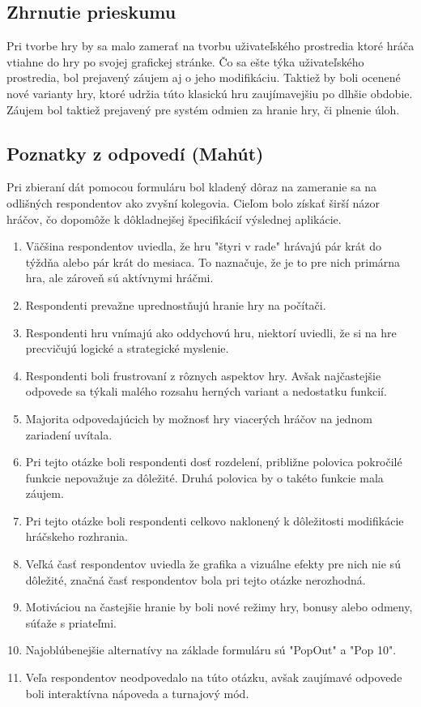 \documentclass[a4paper, 11pt, onecolumn]{article}
\begin{document}
\subsection*{Zhrnutie prieskumu}
Pri tvorbe hry by sa malo zamerať na tvorbu uživateľského prostredia ktoré hráča vtiahne do hry po svojej grafickej stránke.
Čo sa ešte týka uživateľského prostredia, bol prejavený záujem aj o jeho modifikáciu.
Taktiež by boli ocenené nové varianty hry, ktoré udržia túto klasickú hru zaujímavejšiu po dlhšie obdobie. Záujem bol taktiež
prejavený pre systém odmien za hranie hry, či plnenie úloh.
\subsection{Poznatky z odpovedí (Mahút)}
Pri zbieraní dát pomocou formuláru bol kladený dôraz na zameranie sa na odlišných respondentov ako zvyšní kolegovia.
Cieľom bolo získať širší názor hráčov, čo dopomôže k dôkladnejšej špecifikácií výslednej aplikácie.
\begin{enumerate}
  \item Väčšina respondentov uviedla, že hru "štyri v rade" hrávajú pár krát do týždňa alebo pár krát do mesiaca. To naznačuje, že je to pre nich primárna hra, ale zároveň sú aktívnymi hráčmi.
  \item Respondenti prevažne uprednostňujú hranie hry na počítači.
  \item Respondenti hru vnímajú ako oddychovú hru, niektorí uviedli, že si na hre precvičujú logické a strategické myslenie.
  \item Respondenti boli frustrovaní z rôznych aspektov hry. Avšak najčastejšie odpovede sa týkali malého rozsahu herných variant a nedostatku funkcií.
  \item Majorita odpovedajúcich by možnosť hry viacerých hráčov na jednom zariadení uvítala.
  \item Pri tejto otázke boli respondenti dosť rozdelení, približne polovica pokročilé funkcie nepovažuje za dôležité. Druhá polovica by o takéto funkcie mala záujem.
  \item Pri tejto otázke boli respondenti celkovo naklonený k dôležitosti modifikácie hráčskeho rozhrania.
  \item Veľká časť respondentov uviedla že grafika a vizuálne efekty pre nich nie sú dôležité, značná časť respondentov bola pri tejto otázke nerozhodná.
  \item Motiváciou na častejšie hranie by boli nové režimy hry, bonusy alebo odmeny, súťaže s priateľmi.
  \item Najoblúbenejšie alternatívy na základe formuláru sú "PopOut" a "Pop 10".
  \item Veľa respondentov neodpovedalo na túto otázku, avšak zaujímavé odpovede boli interaktívna nápoveda a turnajový mód.
\end{enumerate}
\end{document}
